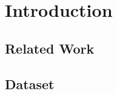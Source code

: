 \chapter{Introduction}
\label{chap:introduction}



\section{Related Work}

\section{Dataset}







